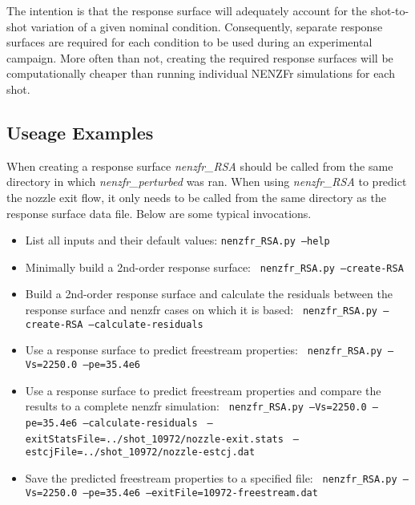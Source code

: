 The intention is that the response surface will adequately account for the shot-to-shot variation of a given nominal condition. Consequently, separate response surfaces are required for each condition to be used during an experimental campaign. More often than not, creating the required response surfaces will be computationally cheaper than running individual NENZFr simulations for each shot.

\subsection{Useage Examples}
When creating a response surface \textit{nenzfr\_RSA} should be called from the same directory in which \textit{nenzfr\_perturbed} was ran. When using \textit{nenzfr\_RSA} to predict the nozzle exit flow, it only needs to be called from the same directory as the response surface data file. Below are some typical invocations.
\begin{itemize}
\item List all inputs and their default values:
\newline
\texttt{nenzfr\_RSA.py --help}
\item Minimally build a 2nd-order response surface: 
\newline
\texttt{   nenzfr\_RSA.py --create-RSA}
\item Build a 2nd-order response surface and calculate the residuals between the response surface and nenzfr cases on which it is based:
\newline
\texttt{   nenzfr\_RSA.py --create-RSA --calculate-residuals}
\item Use a response surface to predict freestream properties:
\newline
\texttt{   nenzfr\_RSA.py --Vs=2250.0 --pe=35.4e6}
\item Use a response surface to predict freestream properties and compare the results to a complete nenzfr simulation:
\newline
\texttt{   nenzfr\_RSA.py --Vs=2250.0 --pe=35.4e6 --calculate-residuals}
\newline
\texttt{     --exitStatsFile=../shot\_10972/nozzle-exit.stats}
\newline
\texttt{     --estcjFile=../shot\_10972/nozzle-estcj.dat}
\item Save the predicted freestream properties to a specified file:
\newline
\texttt{   nenzfr\_RSA.py --Vs=2250.0 --pe=35.4e6 --exitFile=10972-freestream.dat}
\end{itemize}

